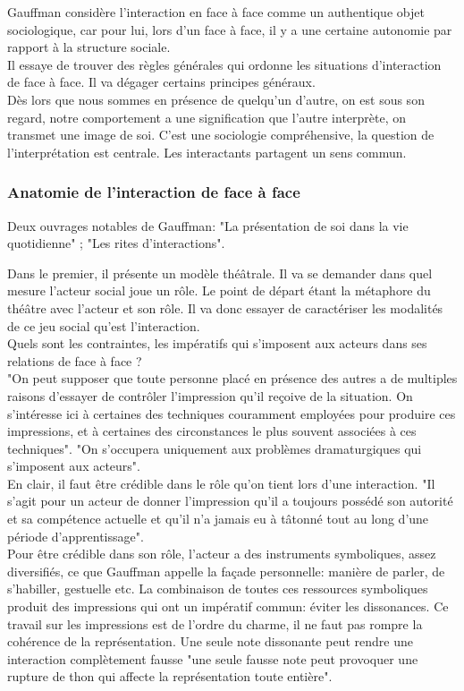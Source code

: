 \documentclass[10pt, a4paper, openany]{book}
\begin{document}
Gauffman considère l'interaction en face à face comme un authentique objet sociologique, car pour lui, lors d'un face à face, il y a une certaine autonomie par rapport à la structure sociale. \\ 
Il essaye de trouver des règles générales qui ordonne les situations d'interaction de face à face. Il va dégager certains principes généraux. \\
Dès lors que nous sommes en présence de quelqu'un d'autre, on est sous son regard, notre comportement a une signification que l'autre interprète, on transmet une image de soi. C'est une sociologie compréhensive, la question de l'interprétation est centrale. Les interactants partagent un sens commun. 

\subsubsection{Anatomie de l'interaction de face à face}

Deux ouvrages notables de Gauffman: "La présentation de soi dans la vie quotidienne" ; "Les rites d'interactions".


Dans le premier, il présente un modèle théâtrale. Il va se demander dans quel mesure l'acteur social joue un rôle. Le point de départ étant la métaphore du théâtre avec l'acteur et son rôle. Il va donc essayer de caractériser les modalités de ce jeu social qu'est l'interaction. \\
Quels sont les contraintes, les impératifs qui s'imposent aux acteurs dans ses relations de face à face ? \\ 
"On peut supposer que toute personne placé en présence des autres a de multiples raisons d'essayer de contrôler l'impression qu'il reçoive de la situation. On s'intéresse ici à certaines des techniques couramment employées pour produire ces impressions, et à certaines des circonstances le plus souvent associées à ces techniques". "On s'occupera uniquement aux problèmes dramaturgiques qui s'imposent aux acteurs". \\
En clair, il faut être crédible dans le rôle qu'on tient lors d'une interaction. "Il s'agit pour un acteur de donner l'impression qu'il a toujours possédé son autorité et sa compétence actuelle et qu'il n'a jamais eu à tâtonné tout au long d'une période d'apprentissage". \\
Pour être crédible dans son rôle, l'acteur a des instruments symboliques, assez diversifiés, ce que Gauffman appelle la façade personnelle: manière de parler, de s'habiller, gestuelle etc. La combinaison de toutes ces ressources symboliques produit des impressions qui ont un impératif
commun: éviter les dissonances. Ce travail sur les impressions est de l'ordre du charme, il ne faut pas rompre la cohérence de la représentation. Une seule note dissonante peut rendre une interaction complètement fausse "une seule fausse note peut provoquer une rupture de thon qui affecte la représentation toute entière".
\end{document}
